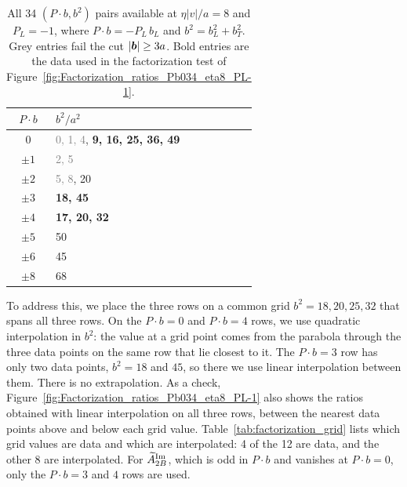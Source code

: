 \begin{table}[H]
    \centering
    \begin{tabular}{c|l}
        \hline
        $P\cdot b$ & $b^2/a^2$ \\
        \hline
        $0$      & \textcolor{gray}{0, 1, 4}, \textbf{9, 16, 25, 36, 49} \\
        $\pm 1$  & \textcolor{gray}{2, 5} \\
        $\pm 2$  & \textcolor{gray}{5, 8}, 20 \\
        $\pm 3$  & \textbf{18, 45} \\
        $\pm 4$  & \textbf{17, 20, 32} \\
        $\pm 5$  & 50 \\
        $\pm 6$  & 45 \\
        $\pm 8$  & 68 \\
        \hline
    \end{tabular}
    \caption{All 34 $(P\cdot b, b^2)$ pairs available at $\eta|v|/a = 8$ and $P_L = -1$, where $P\cdot b = -P_L\,b_L$ and $b^2 = b_L^2 + b_T^2$. Grey entries fail the cut $|\boldsymbol{b}| \ge 3a$. Bold entries are the data used in the factorization test of Figure~\ref{fig:Factorization_ratios_Pb034_eta8_PL-1}.}
    \label{tab:Pb_bsq_pairs}
\end{table}

To address this, we place the three rows on a common grid $b^2 = 18, 20, 25, 32$ that spans all three rows. On the $P\cdot b = 0$ and $P\cdot b = 4$ rows, we use quadratic interpolation in $b^2$: the value at a grid point comes from the parabola through the three data points on the same row that lie closest to it. The $P\cdot b = 3$ row has only two data points, $b^2 = 18$ and $45$, so there we use linear interpolation between them. There is no extrapolation. As a check, Figure~\ref{fig:Factorization_ratios_Pb034_eta8_PL-1} also shows the ratios obtained with linear interpolation on all three rows, between the nearest data points above and below each grid value. Table~\ref{tab:factorization_grid} lists which grid values are data and which are interpolated: 4 of the 12 are data, and the other 8 are interpolated. For $\widetilde{A}_{2B}^{\text{Im}}$, which is odd in $P\cdot b$ and vanishes at $P\cdot b = 0$, only the $P\cdot b = 3$ and $4$ rows are used.

